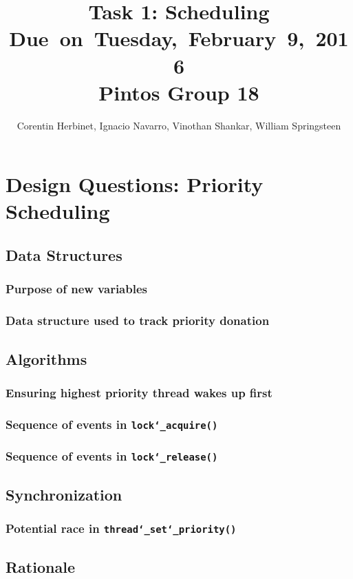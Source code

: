 \documentclass{article}
\title{
\vspace{2in}
\textmd{\textbf{Task 1: Scheduling}}\\
\normalsize\vspace{0.1in}\small{Due\ on\ Tuesday,\ February\ 9,\ 2016}\\
\vspace{0.1in}\large{\textbf{Pintos Group 18}}
\vspace{3in}
}
\author{Corentin Herbinet, Ignacio Navarro, Vinothan Shankar, William Springsteen}
\date{}
\renewcommand{\_}{\char`_}
\begin{document}
\maketitle
\newpage

\section{Design Questions: Priority Scheduling}
\subsection{Data Structures}
\subsubsection{Purpose of new variables}

\subsubsection{Data structure used to track priority donation}

\subsection{Algorithms}
\subsubsection{Ensuring highest priority thread wakes up first}

\subsubsection{Sequence of events in \texttt{lock\_acquire()}}

\subsubsection{Sequence of events in \texttt{lock\_release()}}

\subsection{Synchronization}
\subsubsection{Potential race in \texttt{thread\_set\_priority()}}

\subsection{Rationale}
\end{document}
